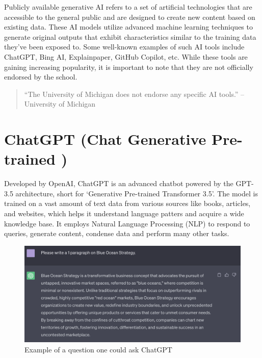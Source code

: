 \documentclass[
]{book}
\begin{document}
Publicly available generative AI refers to a set of artificial technologies that are accessible to the general public and are designed to create new content based on existing data. These AI models utilize advanced machine learning techniques to generate original outputs that exhibit characteristics similar to the training data they've been exposed to. Some well-known examples of such AI tools include ChatGPT, Bing AI, Explainpaper, GitHub Copilot, etc. While these tools are gaining increasing popularity, it is important to note that they are not officially endorsed by the school.

\begin{quote}
``The University of Michigan does not endorse any specific AI tools.'' -- University of Michigan
\end{quote}

\hypertarget{chatgpt-chat-generative-pre-trained}{%
\section{ChatGPT (Chat Generative Pre-trained )}\label{chatgpt-chat-generative-pre-trained}}

Developed by OpenAI, ChatGPT is an advanced chatbot powered by the GPT-3.5 architecture, short for `Generative Pre-trained Transformer 3.5'. The model is trained on a vast amount of text data from various sources like books, articles, and websites, which helps it understand language patters and acquire a wide knowledge base. It employs Natural Language Processing (NLP) to respond to queries, generate content, condense data and perform many other tasks.

\begin{figure}

{\centering \includegraphics[width=0.9\linewidth]{ChatGPT_Example} 

}

\caption{Example of a question one could ask ChatGPT}\label{fig:unnamed-chunk-6}
\end{figure}
\end{document}
